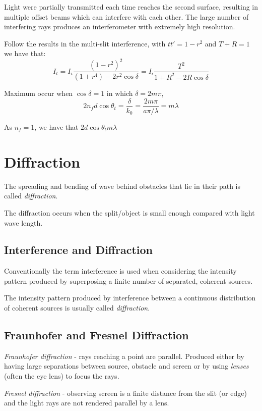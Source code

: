 \documentclass[openany]{book}
\begin{document}
Light were partially transmitted each time reaches the second surface, resulting in multiple offset beams which can interfere with each other. The large number of interfering rays produces an interferometer with extremely high resolution.

Follow the results in the multi-slit interference, with $tt'=1-r^2$ and $T+R=1$ we have that:
\[I_t=I_i\frac{(1-r^2)^2}{(1+r^4)-2r^2\cos \delta}=I_i\frac{T^2}{1+R^2-2R\cos \delta}\]

Maximum occur when $\cos \delta =1$ in which $\delta =2m\pi $,
\[2n_fd\cos \theta _t=\frac{\delta }{k_0}=\frac{2m\pi }{a\pi /\lambda}=m\lambda \]

As $n_f=1$, we have that $2d\cos \theta _tm\lambda $

\section{Diffraction}
The spreading and bending of wave behind obstacles that lie in their path is called \emph{diffraction}.

The diffraction occurs when the split/object is small enough compared with light wave length.
\subsection{Interference and Diffraction}
Conventionally the term interference is used when considering the intensity pattern produced by superposing a finite number of separated, coherent sources. 

The intensity pattern produced by interference between a continuous distribution of coherent sources is usually called \emph{diffraction}.

\subsection{Fraunhofer and Fresnel Diffraction}
\emph{Fraunhofer diffraction} - rays reaching a point are parallel. Produced either by having large separations between source, obstacle and screen or by using \emph{lenses} (often the eye lens) to focus the rays.

\emph{Fresnel diffraction} - observing screen is a finite distance from the slit (or edge) and the light rays are not rendered parallel by a lens.
\end{document}
